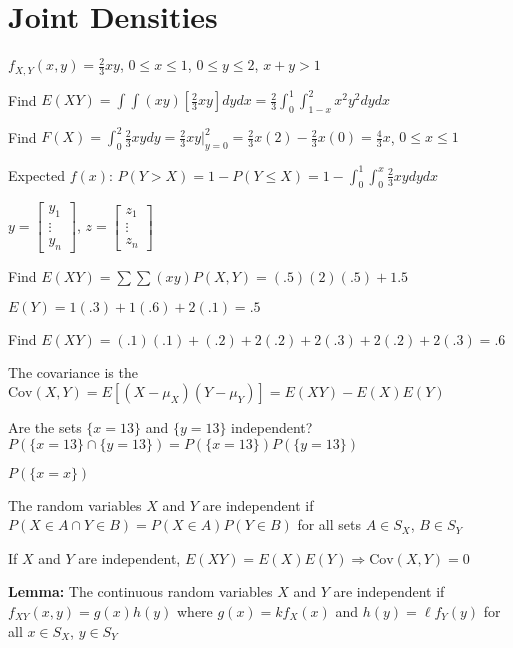 \section{Joint Densities}

\begin{example}
$f_{X,Y}(x,y) = \frac{2}{3} xy$, $0 \leq x \leq 1$, $0 \leq y \leq 2$, $x + y > 1$

Find $E(XY) = \int \int (xy) \left[\frac{2}{3} xy\right] dy dx = \frac{2}{3} \int_0^1 \int_{1-x}^2 x^2 y^2 dy dx$

Find $F(X) = \int_0^2 \frac{2}{3} xy dy = \frac{2}{3} xy \Big|_{y=0}^{2} = \frac{2}{3} x(2) - \frac{2}{3} x(0) = \frac{4}{3}x$, $0 \leq x \leq 1$

Expected $f(x)$: $P(Y > X) = 1 - P(Y \leq X) = 1 - \int_0^1 \int_0^x \frac{2}{3} xy dy dx$

$y = \begin{bmatrix} y_1 \\ \vdots \\ y_n \end{bmatrix}$, $z = \begin{bmatrix} z_1 \\ \vdots \\ z_n \end{bmatrix}$

Find $E(XY) = \sum \sum (xy) P(X,Y) = (.5)(2)(.5) + 1.5$

$E(Y) = 1(.3) + 1(.6) + 2(.1) = .5$

Find $E(XY) = (.1)(.1) + (.2) + 2(.2) + 2(.3) + 2(.2) + 2(.3) = .6$
\end{example}

\begin{definition}
The covariance is the $\text{Cov}(X,Y) = E[(X - \mu_X)(Y - \mu_Y)] = E(XY) - E(X)E(Y)$
\end{definition}

Are the sets $\{x=13\}$ and $\{y=13\}$ independent? $P(\{x=13\} \cap \{y=13\}) = P(\{x=13\})P(\{y=13\})$

$P(\{x=x\})$ 

\begin{theorem}
The random variables $X$ and $Y$ are independent if $P(X \in A \cap Y \in B) = P(X \in A)P(Y \in B)$ for all sets $A \in S_X$, $B \in S_Y$
\end{theorem}

If $X$ and $Y$ are independent, $E(XY) = E(X)E(Y) \Rightarrow \text{Cov}(X,Y) = 0$

\textbf{Lemma:} The continuous random variables $X$ and $Y$ are independent if $f_{XY}(x,y) = g(x)h(y)$ where $g(x) = k f_X(x)$ and $h(y) = \ell f_Y(y)$ for all $x \in S_X$, $y \in S_Y$

